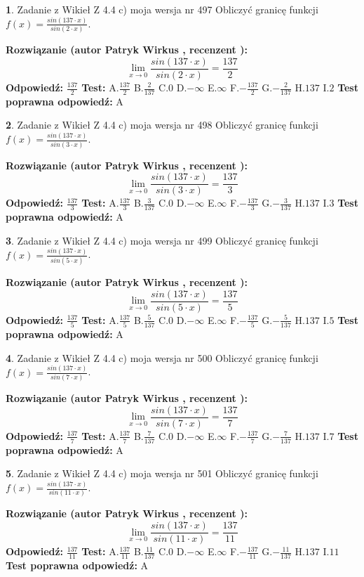 \documentclass[12pt, a4paper]{article}
\theoremstyle{definition} %
\newtheorem{zad}{}
\newcommand{\zadStart}[1]{\begin{zad}#1\newline}
\newcommand{\zadStop}{\end{zad}}
\newcommand{\rozwStart}[2]{\noindent \textbf{Rozwiązanie (autor #1 , recenzent #2): }\newline}
\newcommand{\rozwStop}{\newline}
\newcommand{\odpStart}{\noindent \textbf{Odpowiedź:}\newline}
\newcommand{\odpStop}{\newline}
\newcommand{\testStart}{\noindent \textbf{Test:}\newline}
\newcommand{\testStop}{\newline}
\newcommand{\kluczStart}{\noindent \textbf{Test poprawna odpowiedź:}\newline}
\newcommand{\kluczStop}{\newline}
\begin{document}
\zadStart{Zadanie z Wikieł Z 4.4 c) moja wersja nr 497}
Obliczyć granicę funkcji $f(x)=\frac{sin(137\cdot x)}{sin(2\cdot x)}$.
\zadStop
\rozwStart{Patryk Wirkus}{}
$$\lim\limits_{x\to 0}\frac{sin(137\cdot x)}{sin(2\cdot x)}=
\frac{137}{2}$$
\rozwStop
\odpStart
$\frac{137}{2}$
\odpStop
\testStart
A.$\frac{137}{2}$
B.$\frac{2}{137}$
C.$0$
D.$-\infty$
E.$\infty$
F.$-\frac{137}{2}$
G.$-\frac{2}{137}$
H.$137$
I.$2$
\testStop
\kluczStart
A
\kluczStop



\zadStart{Zadanie z Wikieł Z 4.4 c) moja wersja nr 498}
Obliczyć granicę funkcji $f(x)=\frac{sin(137\cdot x)}{sin(3\cdot x)}$.
\zadStop
\rozwStart{Patryk Wirkus}{}
$$\lim\limits_{x\to 0}\frac{sin(137\cdot x)}{sin(3\cdot x)}=
\frac{137}{3}$$
\rozwStop
\odpStart
$\frac{137}{3}$
\odpStop
\testStart
A.$\frac{137}{3}$
B.$\frac{3}{137}$
C.$0$
D.$-\infty$
E.$\infty$
F.$-\frac{137}{3}$
G.$-\frac{3}{137}$
H.$137$
I.$3$
\testStop
\kluczStart
A
\kluczStop



\zadStart{Zadanie z Wikieł Z 4.4 c) moja wersja nr 499}
Obliczyć granicę funkcji $f(x)=\frac{sin(137\cdot x)}{sin(5\cdot x)}$.
\zadStop
\rozwStart{Patryk Wirkus}{}
$$\lim\limits_{x\to 0}\frac{sin(137\cdot x)}{sin(5\cdot x)}=
\frac{137}{5}$$
\rozwStop
\odpStart
$\frac{137}{5}$
\odpStop
\testStart
A.$\frac{137}{5}$
B.$\frac{5}{137}$
C.$0$
D.$-\infty$
E.$\infty$
F.$-\frac{137}{5}$
G.$-\frac{5}{137}$
H.$137$
I.$5$
\testStop
\kluczStart
A
\kluczStop



\zadStart{Zadanie z Wikieł Z 4.4 c) moja wersja nr 500}
Obliczyć granicę funkcji $f(x)=\frac{sin(137\cdot x)}{sin(7\cdot x)}$.
\zadStop
\rozwStart{Patryk Wirkus}{}
$$\lim\limits_{x\to 0}\frac{sin(137\cdot x)}{sin(7\cdot x)}=
\frac{137}{7}$$
\rozwStop
\odpStart
$\frac{137}{7}$
\odpStop
\testStart
A.$\frac{137}{7}$
B.$\frac{7}{137}$
C.$0$
D.$-\infty$
E.$\infty$
F.$-\frac{137}{7}$
G.$-\frac{7}{137}$
H.$137$
I.$7$
\testStop
\kluczStart
A
\kluczStop



\zadStart{Zadanie z Wikieł Z 4.4 c) moja wersja nr 501}
Obliczyć granicę funkcji $f(x)=\frac{sin(137\cdot x)}{sin(11\cdot x)}$.
\zadStop
\rozwStart{Patryk Wirkus}{}
$$\lim\limits_{x\to 0}\frac{sin(137\cdot x)}{sin(11\cdot x)}=
\frac{137}{11}$$
\rozwStop
\odpStart
$\frac{137}{11}$
\odpStop
\testStart
A.$\frac{137}{11}$
B.$\frac{11}{137}$
C.$0$
D.$-\infty$
E.$\infty$
F.$-\frac{137}{11}$
G.$-\frac{11}{137}$
H.$137$
I.$11$
\testStop
\kluczStart
A
\kluczStop
\end{document}
